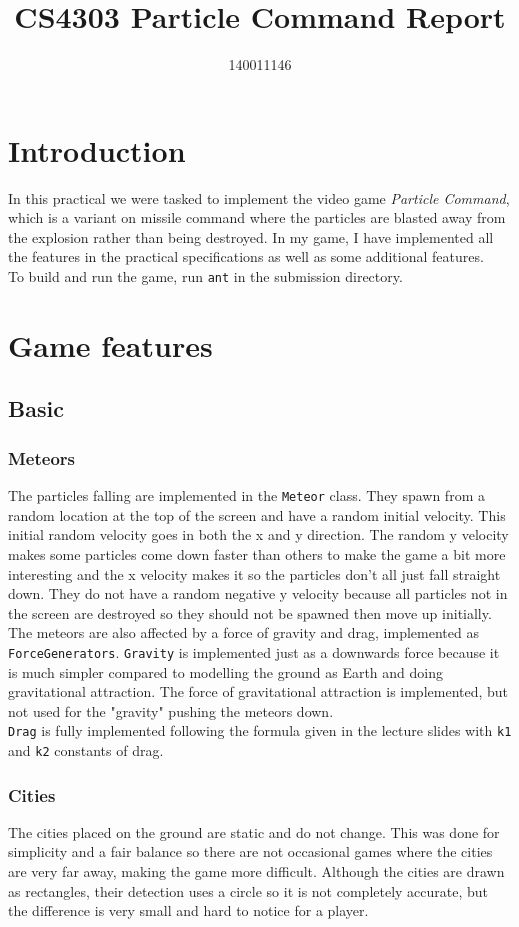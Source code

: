\documentclass{article}
\title{CS4303 Particle Command Report}
\author{140011146}
\newcommand{\n}[0]{\\[\baselineskip]}
\begin{document}
\maketitle

\section{Introduction}
In this practical we were tasked to implement the video game \textit{Particle Command}, which is a variant on missile command where the particles are blasted away from the explosion rather than being destroyed. In my game, I have implemented all the features in the practical specifications as well as some additional features.
\n
To build and run the game, run \texttt{ant} in the submission directory.

\section{Game features}

\subsection{Basic}
\subsubsection*{Meteors}
The particles falling are implemented in the \texttt{Meteor} class. They spawn from a random location at the top of the screen and have a random initial velocity. This initial random velocity goes in both the x and y direction. The random y velocity makes some particles come down faster than others to make the game a bit more interesting and the x velocity makes it so the particles don't all just fall straight down. They do not have a random negative y velocity because all particles not in the screen are destroyed so they should not be spawned then move up initially. 
\n
The meteors are also affected by a force of gravity and drag, implemented as \texttt{ForceGenerators}. \texttt{Gravity} is implemented just as a downwards force because it is much simpler compared to modelling the ground as Earth and doing gravitational attraction. The force of gravitational attraction is implemented, but not used for the "gravity" pushing the meteors down. 
\n
\texttt{Drag} is fully implemented following the formula given in the lecture slides with \texttt{k1} and \texttt{k2} constants of drag.

\subsubsection*{Cities}
The cities placed on the ground are static and do not change. This was done for simplicity and a fair balance so there are not occasional games where the cities are very far away, making the game more difficult. Although the cities are drawn as rectangles, their detection uses a circle so it is not completely accurate, but the difference is very small and hard to notice for a player. 
\end{document}
